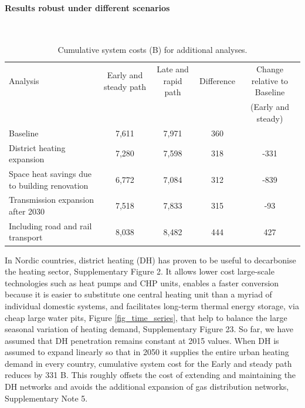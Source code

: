 \documentclass[5p]{elsarticle} %
\begin{document}
 
\paragraph{\textbf{Results robust under different scenarios}} \

\begin{table}[!h]
\footnotesize
\centering
\begin{threeparttable}
\caption{Cumulative system costs (B\EUR) for additional analyses.} \label{tab_additional_analyses}
\centering
\begin{tabularx}{18.5cm}{lcccc}
\toprule
Analysis & Early and steady path & Late and rapid path & Difference & Change relative to Baseline \\
 &  &  & & (Early and steady) \\
\midrule
Baseline	& 7,611	& 7,971	& 360 & \\
District heating expansion	& 7,280	& 7,598	& 318 & -331 \\
Space heat savings due to building renovation	& 6,772	& 7,084	& 312 & -839 \\
Transmission expansion after 2030 & 7,518 &	7,833	& 315 & -93 \\
Including road and rail transport &	8,038	& 8,482 &	444 & 427 \\
\bottomrule
\end{tabularx}
\end{threeparttable}
\end{table}

In Nordic countries, district heating (DH) has proven to be useful to decarbonise the heating sector, Supplementary Figure 2. It allows lower cost large-scale technologies such as heat pumps and CHP units, enables a faster conversion because it is easier to substitute one central heating unit than a myriad of individual domestic systems, and facilitates long-term thermal energy storage, via cheap large water pits, Figure \ref{fig_time_series}, that help to balance the large seasonal variation of heating demand, Supplementary Figure 23. So far, we have assumed that DH penetration remains constant at 2015 values. When DH is assumed to expand linearly so that in 2050 it supplies the entire urban heating demand in every country, cumulative system cost for the Early and steady path reduces by 331 B\EUR. This roughly offsets the cost of extending and maintaining the DH networks and avoids the additional expansion of gas distribution networks, Supplementary Note 5. \\
\end{document}
